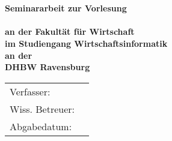 \begin{titlepage}
	\begin{center}
		\vspace*{2cm}
		\LARGE\bf\myTopic\\
		\Large\rm\mySubTopic\\
		\vspace*{3cm}
		\bf Seminararbeit zur Vorlesung\\
		\myVorlesung\\
		\normalsize\rm
		\vspace*{1cm}
		an der Fakultät für Wirtschaft\\
		im Studiengang Wirtschaftsinformatik\\
		\vspace*{1cm}
		an der\\
		DHBW Ravensburg
		\vfill
	\end{center}
	\begin{tabular}{ll}
		Verfasser:&\myAutor\\
		Wiss. Betreuer:&\myProf\\
		Abgabedatum:&\myEndDate\\
	\end{tabular}
\end{titlepage}
\newpage
\setcounter{page}{2}
